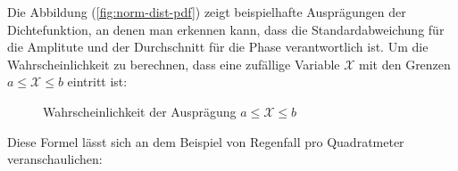             \noindent
            Die Abbildung (\ref{fig:norm-dist-pdf}) zeigt beispielhafte Ausprägungen der Dichtefunktion, an denen man erkennen kann, dass die Standardabweichung für die Amplitute und der Durchschnitt für die Phase verantwortlich ist. Um die Wahrscheinlichkeit zu berechnen, dass eine zufällige Variable $\mathcal{X}$  mit den Grenzen $a \leq \mathcal{X} \leq b$ eintritt ist:

            \begin{figure}[H]
                \begin{mdframed}
                    \hspace*{40mm} 
                \end{mdframed}
                \caption{Wahrscheinlichkeit der Ausprägung $a \leq \mathcal{X} \leq b$}
            \end{figure}

            \noindent
            Diese Formel lässt sich an dem Beispiel von Regenfall pro Quadratmeter veranschaulichen:

